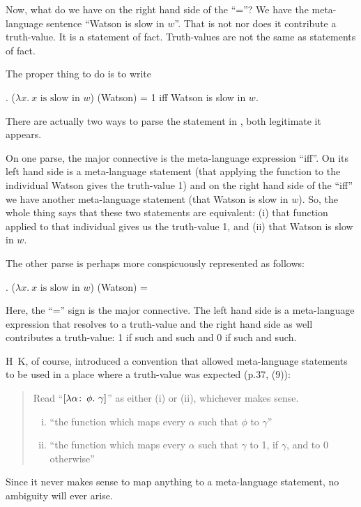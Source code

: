 Now, what do we have on the right hand side of the ``=''? We have the
meta-language sentence ``Watson is slow in $w$''. That is not nor does it
contribute a truth-value. It is a statement of fact. Truth-values are not the
same as statements of fact.

The proper thing to do is to write

\ex. ($\lambda x.\ x \mbox{ is slow in } w$) (Watson) = 1 iff Watson
is slow in $w$.\label{ex:goodwatson}

There are actually two ways to parse the statement in \Last, both legitimate it
appears.

On one parse, the major connective is the meta-language expression ``iff''. On
its left hand side is a meta-language statement (that applying the function to
the individual Watson gives the truth-value 1) and on the right hand side of the
``iff'' we have another meta-language statement (that Watson is slow in $w$).
So, the whole thing says that these two statements are equivalent: (i) that
function applied to that individual gives us the truth-value 1, and (ii) that
Watson is slow in $w$.

The other parse is perhaps more conspicuously represented as follows:

\ex. ($\lambda x.\ x \mbox{ is slow in } w$) (Watson) = 

Here, the ``='' sign is the major connective. The left hand side is a
meta-language expression that resolves to a truth-value and the right hand
side %
%
as well contributes a truth-value: 1 if such and such and 0 if such and such.

H\amp\ K, of course, introduced a convention that allowed meta-language
statements to be used in a place where a truth-value was expected (p.37, (9)):

\begin{quote}
  Read ``$[\lambda \alpha\co \phi.\ \gamma]$'' as either (i) or (ii),
  whichever makes sense.
  \begin{enumerate}[(i)]
  \item ``the function which maps every $\alpha$ such that $\phi$ to
    $\gamma$''
  \item ``the function which maps every $\alpha$ such that $\gamma$ to
    1, if $\gamma$, and to 0 otherwise''
  \end{enumerate}
\end{quote}
%
Since it never makes sense to map anything to a meta-language statement, no
ambiguity will ever arise.

